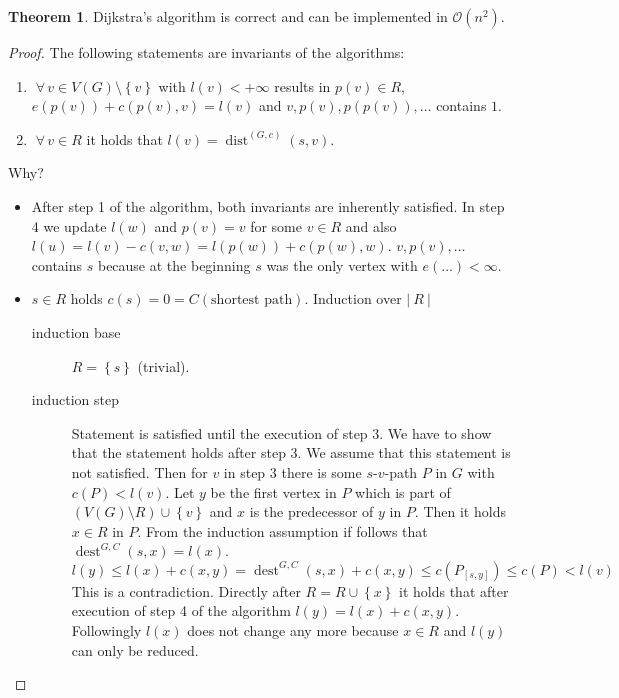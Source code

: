 \documentclass[a4paper]{article}
\theoremstyle{definition}
\newtheorem{theorem}{Theorem}
\newcommand{\card}[1]{\left|\:\!#1\:\!\right|}
\newcommand{\set}[1]{\left\{#1\right\}}
\newcommand{\gath}[2]{$#1$-$#2$-path} %
\newcommand{\fall}{\;\forall\,}
\begin{document}
\begin{theorem}\label{satz-3.2}
  Dijkstra's algorithm is correct and can be implemented in $\mathcal{O}(n^2)$.
\end{theorem}

\begin{proof}
  The following statements are invariants of the algorithms:
  \begin{enumerate}
    \item $\fall v \in V(G) \setminus \set{v}$ with $l(v) < +\infty$ results in $p(v) \in R$, $e(p(v)) + c(p(v), v) = l(v)$ and $v, p(v), p(p(v)), \ldots$ contains $1$.
    \item $\fall v \in R$ it holds that $l(v) = \operatorname{dist}^{(G,c)}(s, v)$.
  \end{enumerate}
  Why?
  \begin{itemize}
    \item
      After step 1 of the algorithm, both invariants are inherently satisfied.
      In step 4 we update $l(w)$ and $p(v) = v$ for some $v \in R$ and also $l(u) = l(v) - c(v, w) = l(p(w)) + c(p(w), w)$. $v, p(v), \ldots$ contains $s$ because at the beginning $s$ was the only vertex with $e(\dots) < \infty$.
    \item
      $s \in R$ holds $c(s) = 0 = C(\text{shortest path})$.
      Induction over $\card{R}$
      \begin{description}
        \item[induction base] $R = \set{s}$ (trivial).
        \item[induction step] Statement is satisfied until the execution of step 3. We have to show that the statement holds after step 3. We assume that this statement is not satisfied. Then for $v$ in step 3 there is some \gath sv $P$ in $G$ with $c(P) < l(v)$. Let $y$ be the first vertex in $P$ which is part of $(V(G) \setminus R) \cup \set{v}$ and $x$ is the predecessor of $y$ in $P$.
        Then it holds $x \in R$ in $P$. From the induction assumption if follows that $\operatorname{dest}^{G,C}(s,x) = l(x)$.
        \[
          l(y) \leq l(x) + c(x, y) = \operatorname{dest}^{G,C}(s, x) + c(x,y) \leq c(P_{[s,y]}) \leq c(P) < l(v)
        \]
        This is a contradiction.
        Directly after $R = R \cup \set{x}$ it holds that after execution of step 4 of the algorithm $l(y) = l(x) + c(x, y)$. Followingly $l(x)$ does not change any more because $x \in R$ and $l(y)$ can only be reduced.
      \end{description}
  \end{itemize}
\end{proof}
\end{document}
